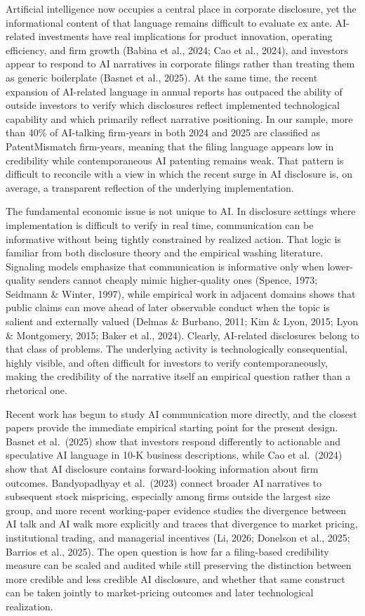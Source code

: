 Artificial intelligence now occupies a central place in corporate disclosure, yet the informational content of that language remains difficult to evaluate ex ante. AI-related investments have real implications for product innovation, operating efficiency, and firm growth (Babina et al., 2024; Cao et al., 2024), and investors appear to respond to AI narratives in corporate filings rather than treating them as generic boilerplate (Basnet et al., 2025). At the same time, the recent expansion of AI-related language in annual reports has outpaced the ability of outside investors to verify which disclosures reflect implemented technological capability and which primarily reflect narrative positioning. In our sample, more than 40\% of AI-talking firm-years in both 2024 and 2025 are classified as PatentMismatch firm-years, meaning that the filing language appears low in credibility while contemporaneous AI patenting remains weak. That pattern is difficult to reconcile with a view in which the recent surge in AI disclosure is, on average, a transparent reflection of the underlying implementation.

The fundamental economic issue is not unique to AI. In disclosure settings where implementation is difficult to verify in real time, communication can be informative without being tightly constrained by realized action. That logic is familiar from both disclosure theory and the empirical washing literature. Signaling models emphasize that communication is informative only when lower-quality senders cannot cheaply mimic higher-quality ones (Spence, 1973; Seidmann \& Winter, 1997), while empirical work in adjacent domains shows that public claims can move ahead of later observable conduct when the topic is salient and externally valued (Delmas \& Burbano, 2011; Kim \& Lyon, 2015; Lyon \& Montgomery, 2015; Baker et al., 2024). Clearly, AI-related disclosures belong to that class of problems. The underlying activity is technologically consequential, highly visible, and often difficult for investors to verify contemporaneously, making the credibility of the narrative itself an empirical question rather than a rhetorical one.

Recent work has begun to study AI communication more directly, and the closest papers provide the immediate empirical starting point for the present design. Basnet et al.~(2025) show that investors respond differently to actionable and speculative AI language in 10-K business descriptions, while Cao et al.~(2024) show that AI disclosure contains forward-looking information about firm outcomes. Bandyopadhyay et al.~(2023) connect broader AI narratives to subsequent stock mispricing, especially among firms outside the largest size group, and more recent working-paper evidence studies the divergence between AI talk and AI walk more explicitly and traces that divergence to market pricing, institutional trading, and managerial incentives (Li, 2026; Donelson et al., 2025; Barrios et al., 2025). The open question is how far a filing-based credibility measure can be scaled and audited while still preserving the distinction between more credible and less credible AI disclosure, and whether that same construct can be taken jointly to market-pricing outcomes and later technological realization.

